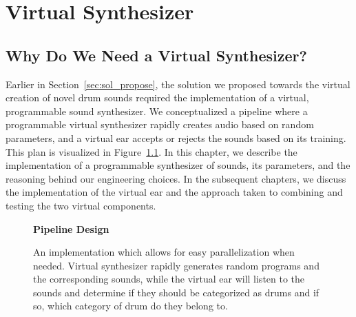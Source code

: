 \documentclass[\main/thesis.tex]{subfiles}
\begin{document}
\chapter{Virtual Synthesizer}
\label{chap:virt_synth}
\section{Why Do We Need a Virtual Synthesizer?}
Earlier in Section~\ref{sec:sol_propose}, the solution we proposed towards the virtual creation of novel drum sounds required the implementation of a virtual, programmable sound synthesizer. We conceptualized a pipeline where a programmable virtual synthesizer rapidly creates audio based on random parameters, and a virtual ear accepts or rejects the sounds based on its training. This plan is visualized in  Figure~\ref{fig:pipeline_outline}. In this chapter, we describe the implementation of a programmable synthesizer of sounds, its parameters, and the reasoning behind our engineering choices. In the subsequent chapters, we discuss the implementation of the virtual ear and the approach taken to combining and testing the two virtual components. 
\label{vs}
 \begin{figure}[h!]
    \begin{center}
    \textbf{Pipeline Design}
    \end{center}
    \caption{An implementation which allows for easy parallelization when needed. Virtual synthesizer rapidly generates random programs and the corresponding sounds, while the virtual ear will listen to the sounds and determine if they should be categorized as drums and if so, which category of drum do they belong to. 
    }
\label{fig:pipeline_outline}
\end{figure}
\end{document}
